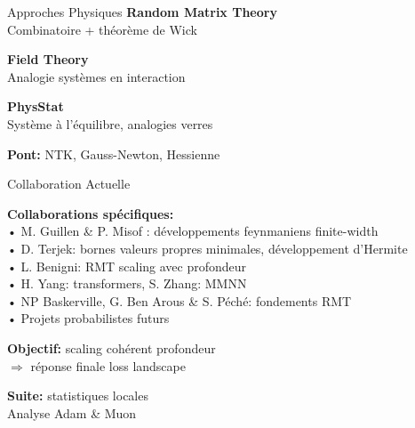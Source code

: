 \documentclass{beamer}
\begin{document}
\begin{frame}{Approches Physiques}
\textbf{Random Matrix Theory}\\
Combinatoire + théorème de Wick

\textbf{Field Theory}\\
Analogie systèmes en interaction

\textbf{PhysStat}\\
Système à l'équilibre, analogies verres

\vspace{0.5cm}

\textbf{Pont:} NTK, Gauss-Newton, Hessienne
\end{frame}

\begin{frame}{Collaboration Actuelle}

\vspace{0.3cm}

\textbf{Collaborations spécifiques:}\\
• M. Guillen \& P. Misof : développements feynmaniens finite-width\\
• D. Terjek: bornes valeurs propres minimales, développement d'Hermite\\
• L. Benigni: RMT scaling avec profondeur\\
• H. Yang: transformers, S. Zhang: MMNN\\
• NP Baskerville, G. Ben Arous \& S. Péché: fondements RMT\\
• Projets probabilistes futurs


\vspace{0.5cm}

\textbf{Objectif:} scaling cohérent profondeur\\
$\Rightarrow$ réponse finale loss landscape

\vspace{0.5cm}

\textbf{Suite:} statistiques locales\\
Analyse Adam \& Muon
\end{frame}
\end{document}
